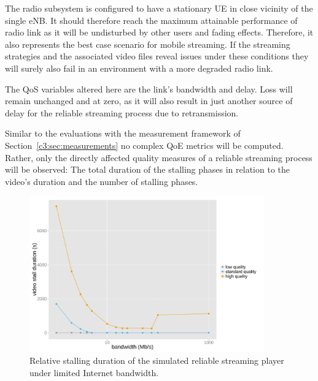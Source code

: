 The radio subsystem is configured to have a stationary \gls{UE} in close vicinity of the single \gls{eNB}. It should therefore reach the maximum attainable performance of radio link as it will be undisturbed by other users and fading effects. Therefore, it also represents the best case scenario for mobile streaming. If the streaming strategies and the associated video files reveal issues under these conditions they will surely also fail in an environment with a more degraded radio link.

The \gls{QoS} variables altered here are the link's bandwidth and delay. Loss will remain unchanged and at zero, as it will also result in just another source of delay for the reliable streaming process due to retransmission. 

Similar to the evaluations with the measurement framework of Section~\ref{c3:sec:measurements} no complex \gls{QoE} metrics will be computed. Rather, only the directly affected quality measures of a reliable streaming process will be observed: The total duration of the stalling phases in relation to the video's duration and the number of stalling phases.

\begin{figure}[htb]
	\centering
	\includegraphics[width=0.9\textwidth]{images/R-ltesim-bwseries-stallduration.pdf}
	\caption{Relative stalling duration of the simulated reliable streaming player under limited Internet bandwidth.}
\label{c6:fig:ltesim-bwseries-stallduration}
\end{figure}

